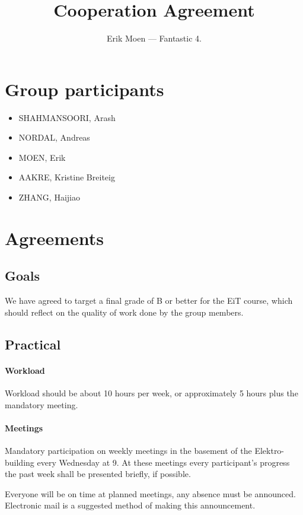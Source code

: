 \documentclass[a4paper, oneside, fleqn]{scrartcl}
\begin{document}
\title{Cooperation Agreement}
\subject{Homo Mobilis — Eksperter i Team}
\author{Erik Moen — Fantastic 4.}
\maketitle
\section*{Group participants}
\begin{itemize}
  \item SHAHMANSOORI, Arash
  \item NORDAL, Andreas
  \item MOEN, Erik
  \item AAKRE, Kristine Breiteig
  \item ZHANG, Haijiao
\end{itemize}

\section*{Agreements}

\subsection*{Goals}
We have agreed to target a final grade of B or better for the EiT course, which should reflect on the quality of work done by the group members.

\subsection*{Practical}
\paragraph{Workload}
Workload should be about 10 hours per week, or approximately 5 hours plus the mandatory meeting.

\paragraph{Meetings}
Mandatory participation on weekly meetings in the basement of the Elektro-building every Wednesday at 9. At these meetings every participant's progress the past week shall be presented briefly, if possible.

Everyone will be on time at planned meetings, any absence must be announced. Electronic mail is a suggested method of making this announcement.
\end{document}
